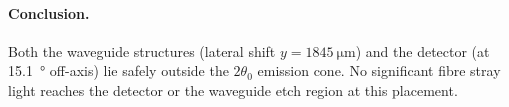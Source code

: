 \paragraph{Conclusion.}
Both the waveguide structures (lateral shift $y = \SI{1845}{\micro\metre}$)
and the detector (at \SI{15.1}{\degree} off-axis) lie safely outside the
$2\theta_0$ emission cone.  No significant fibre stray light reaches the
detector or the waveguide etch region at this placement.
